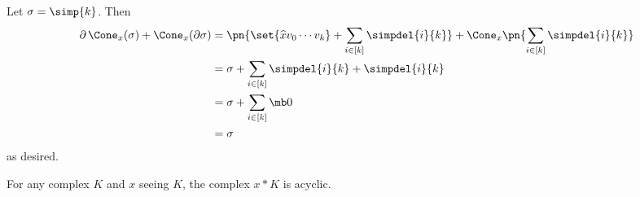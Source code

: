 \begin{solution}
  Let $\sigma = \simp{k}$. Then
  \begin{align*}
    \partial\, \Cone_x(\sigma) + \Cone_x(\partial \sigma)
    &= \pn{\set{\widehat{x}v_0\cdots v_k} + \sum_{i\in [k]} \simpdel{i}{k}} + \Cone_x \pn{\sum_{i\in [k]} \simpdel{i}{k}} \\
    &= \sigma + \sum_{i\in [k]} \simpdel{i}{k} + \simpdel{i}{k} \\
    &= \sigma + \sum_{i \in [k]} \mb 0 \\
    &= \sigma
  \end{align*}
  as desired.
\end{solution}
\begin{problem}[16.12]
  For any complex $K$ and $x$ seeing $K$, the complex $x*K$ is acyclic.
\end{problem}
\begin{solution}

\end{solution}
\begin{problem}[16.13]

\end{problem}
\begin{solution}

\end{solution}
